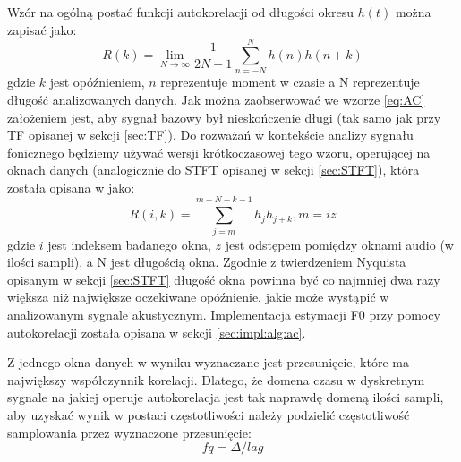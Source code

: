 \documentclass[12pt,a4paper,twoside]{mwart}
\begin{document}
Wzór na ogólną postać funkcji autokorelacji od długości okresu $h(t)$ można zapisać jako:
\begin{equation}\label{eq:AC}
  R(k) = \lim_{N \to \infty} \frac{1}{2N + 1} \sum_{n=-N}^{N} h(n)h(n + k)
\end{equation}
gdzie $k$ jest opóźnieniem, $n$ reprezentuje moment w czasie a N reprezentuje długość analizowanych danych. Jak można zaobserwować we wzorze \ref{eq:AC} założeniem jest, aby sygnał bazowy był nieskończenie długi (tak samo jak przy TF opisanej w sekcji \ref{sec:TF}). Do rozważań w kontekście analizy sygnału fonicznego będziemy używać wersji krótkoczasowej tego wzoru, operującej na oknach danych (analogicznie do STFT opisanej w sekcji \ref{sec:STFT}), która została opisana w
\cite[503]{Transcription:Talkin:RAPT}
jako:
\begin{equation}\label{eq:STAC}
  R(i,k) = \sum_{j=m}^{m + N - k - 1} h_jh_{j+k}, m = iz
\end{equation}
gdzie $i$ jest indeksem badanego okna, $z$ jest odstępem pomiędzy oknami audio (w ilości sampli), a N jest długością okna. Zgodnie z twierdzeniem Nyquista opisanym w sekcji \ref{sec:STFT} długość okna powinna być co najmniej dwa razy większa niż największe oczekiwane opóźnienie, jakie może wystąpić w analizowanym sygnale akustycznym. Implementacja estymacji F0 przy pomocy autokorelacji została opisana w sekcji \ref{sec:impl:alg:ac}.

Z jednego okna danych w wyniku wyznaczane jest przesunięcie, które ma największy współczynnik korelacji. Dlatego, że domena czasu w dyskretnym sygnale na jakiej operuje autokorelacja jest tak naprawdę domeną ilości sampli, aby uzyskać wynik w postaci częstotliwości należy podzielić częstotliwość samplowania przez wyznaczone przesunięcie:
\begin{equation}\label{eq:AC:hz}
  fq = \Delta/lag
\end{equation}
\end{document}
